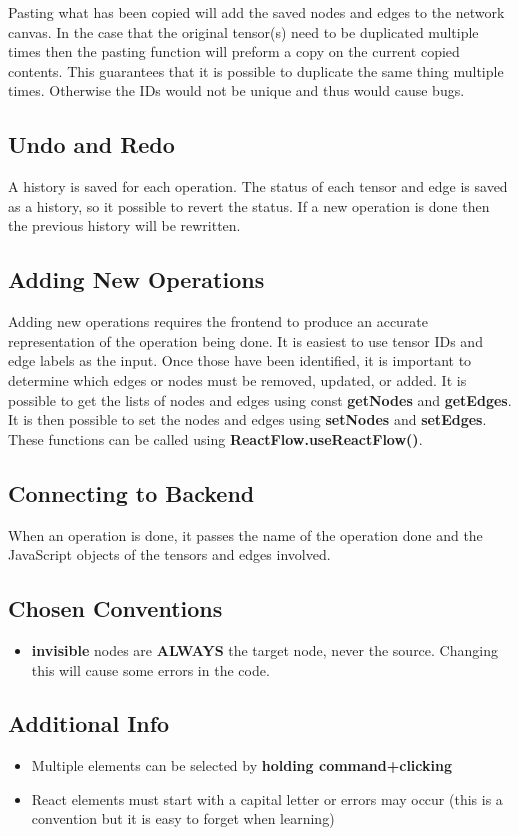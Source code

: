 \documentclass{juliacon}
\begin{document}
\begin{appendix}
Pasting what has been copied will add the saved nodes and edges to the network canvas. In the case that the original tensor(s) need to be duplicated multiple times then the pasting function will preform a copy on the current copied contents. This guarantees that it is possible to duplicate the same thing multiple times. Otherwise the IDs would not be unique and thus would cause bugs. 


\subsection{Undo and Redo}
A history is saved for each operation. The status of each tensor and edge is saved as a history, so it possible to revert the status. If a new operation is done then the previous history will be rewritten.

\subsection{Adding New Operations}
Adding new operations requires the frontend to produce an accurate representation of the operation being done. It is easiest to use tensor IDs and edge labels as the input. Once those have been identified, it is important to determine which edges or nodes must be removed, updated, or added. It is possible to get the lists of nodes and edges using const \textbf{getNodes} and \textbf{getEdges}. It is then possible to set the nodes and edges using \textbf{setNodes} and \textbf{setEdges}. These functions can be called using \textbf{ ReactFlow.useReactFlow()}.

\subsection{Connecting to Backend}
When an operation is done, it passes the name of the operation done and the JavaScript objects of the tensors and edges involved.

\subsection{Chosen Conventions}
\begin{itemize}
	\item \textbf{invisible} nodes are \textbf{ALWAYS} the target node, never the source. Changing this will cause some errors in the code.
\end{itemize}

\subsection{Additional Info}
\begin{itemize}
	\item Multiple elements can be selected by \textbf{holding command+clicking}
	\item React elements must start with a capital letter or errors may occur (this is a convention but it is easy to forget when learning)
\end{itemize}



\end{appendix}
\end{document}

